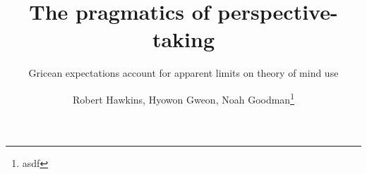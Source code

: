 \documentclass[manuscript]{stjour}
\begin{document}
\title{The pragmatics of perspective-taking}
\subtitle{Gricean expectations account for apparent limits on theory of mind use}



\author[Hawkins, Gweon, Goodman]
{Robert Hawkins, Hyowon Gweon, Noah Goodman\thanks{asdf}}








\end{document}
